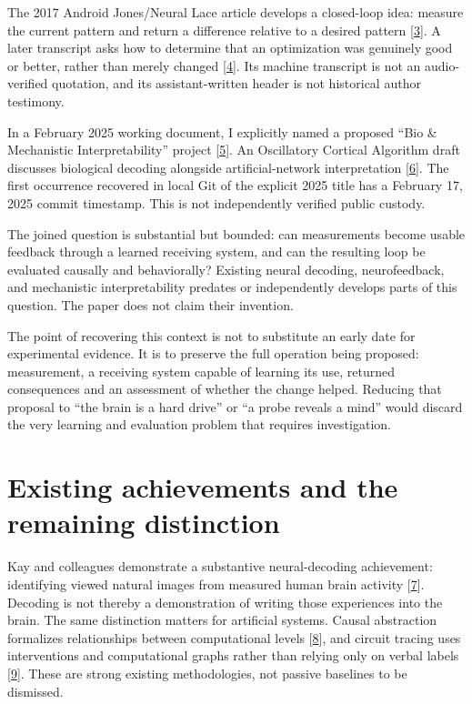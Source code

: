 \documentclass[11pt,letterpaper]{article}
\begin{document}
The 2017 Android Jones/Neural Lace article develops a closed-loop idea: measure the current pattern and return a difference relative to a desired pattern [\hyperref[ref:3]{3}]. A later transcript asks how to determine that an optimization was genuinely good or better, rather than merely changed [\hyperref[ref:4]{4}]. Its machine transcript is not an audio-verified quotation, and its assistant-written header is not historical author testimony.

In a February 2025 working document, I explicitly named a proposed “Bio \& Mechanistic Interpretability” project [\hyperref[ref:5]{5}]. An Oscillatory Cortical Algorithm draft discusses biological decoding alongside artificial-network interpretation [\hyperref[ref:6]{6}]. The first occurrence recovered in local Git of the explicit 2025 title has a February 17, 2025 commit timestamp. This is not independently verified public custody.

The joined question is substantial but bounded: can measurements become usable feedback through a learned receiving system, and can the resulting loop be evaluated causally and behaviorally? Existing neural decoding, neurofeedback, and mechanistic interpretability predates or independently develops parts of this question. The paper does not claim their invention.

The point of recovering this context is not to substitute an early date for experimental evidence. It is to preserve the full operation being proposed: measurement, a receiving system capable of learning its use, returned consequences and an assessment of whether the change helped. Reducing that proposal to “the brain is a hard drive” or “a probe reveals a mind” would discard the very learning and evaluation problem that requires investigation.

\section{Existing achievements and the remaining distinction}

Kay and colleagues demonstrate a substantive neural-decoding achievement: identifying viewed natural images from measured human brain activity [\hyperref[ref:7]{7}]. Decoding is not thereby a demonstration of writing those experiences into the brain. The same distinction matters for artificial systems. Causal abstraction formalizes relationships between computational levels [\hyperref[ref:8]{8}], and circuit tracing uses interventions and computational graphs rather than relying only on verbal labels [\hyperref[ref:9]{9}]. These are strong existing methodologies, not passive baselines to be dismissed.
\end{document}
